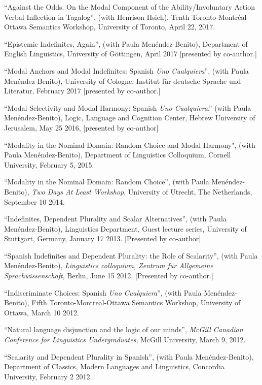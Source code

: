 \documentclass[11pt]{article}
\begin{document}
``Against the Odds. On the Modal Component of the Ability/Involuntary Action Verbal Inflection in Tagalog'', (with Henrison Hsieh), Tenth Toronto-Montr\'eal-Ottawa Semantics Workshop, University of
Toronto, April 22, 2017.

``Epistemic Indefinites, Again'', (with Paula Men\'endez-Benito), Department of English Linguistics, University of G\"{o}ttingen, April 2017 [presented by co-author.]

``Modal Anchors and Modal Indefinites: Spanish \textit{Uno Cualquiera}'', (with Paula Men\'endez-Benito), University of Cologne, Institut f\"ur deutsche Sprache und Literatur, February 2017 [presented by co-author.]

``Modal Selectivity and Modal Harmony: Spanish \textit{Uno Cualquiera}.'' (with Paula Men\'endez-Benito), Logic, Language and Cognition Center, Hebrew University of Jerusalem, May 25 2016, [presented by co-author]

``Modality in the Nominal Domain: Random Choice and Modal Harmony", (with Paula Men\'endez-Benito), Department of Linguistics Colloquium, Cornell University, February 5, 2015.

``Modality in the Nominal Domain: Random Choice'',
(with Paula Men\'endez-Benito), \textit{Two Days At Least Workshop},
University of Utrecht, The Netherlands, September 10 2014.

``Indefinites, Dependent Plurality and Scalar
Alternatives'', (with Paula Men\'endez-Benito), Linguistics Department, Guest lecture series, University of Stuttgart, Germany, January 17 2013. [Presented by co-author]

``Spanish Indefinites and Dependent Plurality: the Role of
Scalarity'',  (with Paula Men\'endez-Benito), \textit{Linguistics colloquium, Zentrum f\"{u}r
  Allgemeine Sprachwissenschaft}, Berlin, June 15 2012. [Presented by co-author.]

``Indiscriminate Choices: Spanish \textit{Uno
  Cualquiera}'', (with Paula Men\'endez-Benito), Fifth Toronto-Montreal-Ottawa Semantics Workshop, University of
Ottawa, March 10 2012.

``Natural language disjunction and the logic of our
minds'', \textit{McGill Canadian Conference for Linguistics
  Undergraduates}, McGill University, March 9, 2012.

``Scalarity and Dependent Plurality in Spanish'', (with Paula Men\'endez-Benito),
Department of Classics, Modern Languages and Linguistics, Concordia
University, February 2 2012.
\end{document}
